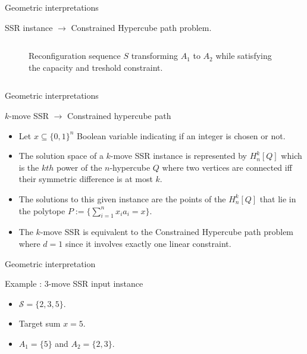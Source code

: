 \begin{frame}{Geometric interpretations}
\begin{block}{SSR instance $\rightarrow$ Constrained Hypercube path problem.}
\begin{columns}
\begin{column}{0.5\textwidth}
\begin{figure}
                    \caption{Reconfiguration sequence $S$ transforming $A_1$ to $A_2$ while satisfying the capacity and treshold constraint.\hfill \break}
                    \label{fig:circle}
                    \end{figure}
                \end{column}
            \end{columns}
  \end{block}
\end{frame}

\begin{frame}{Geometric interpretations}
   \begin{block}{$k$-move SSR $\rightarrow$ Constrained hypercube path}
       \begin{itemize}
            \item Let $x \subseteq \{0,1\}^n$ Boolean variable indicating if an integer is chosen or not. 
           \item The solution space of a $k$-move SSR instance is represented by $H_n^{k}[Q]$ which is the $kth$ power of the $n$-hypercube $Q$ where two vertices are connected iff their symmetric difference is at most $k$. 
           \item The solutions to this given instance are the points of the  $H_n^{k}[Q]$ that lie in the polytope $P := \{ \sum_{i=1}^{n} x_{i}a_{i} = x\}$.
           \item The $k$-move SSR is equivalent to the Constrained Hypercube path problem where $d = 1$ since it involves exactly one linear constraint. 
       \end{itemize}
   \end{block}
\end{frame}


\begin{frame}{Geometric interpretation}
  \begin{block}{Example : $3$-move SSR input instance}
  \begin{itemize}
      \item $\mathcal{S} = \{2,3,5\}$.
      \item Target sum $x = 5.$
      \item $A_1 = \{5\}$ and $A_2 = \{2,3\}.$
  \end{itemize}
  \end{block}
\end{frame}


